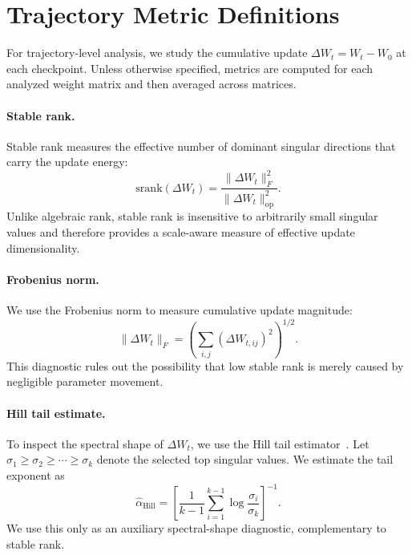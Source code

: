 \documentclass{llmxive}
\begin{document}
\section{Trajectory Metric Definitions}
\label{app:trajectory-metrics}

For trajectory-level analysis, we study the cumulative update
$\Delta W_t = W_t - W_0$ at each checkpoint. Unless otherwise specified,
metrics are computed for each analyzed weight matrix and then averaged
across matrices.

\paragraph{Stable rank.}
Stable rank measures the effective number of dominant singular directions
that carry the update energy:
\begin{equation}
    \mathrm{srank}(\Delta W_t)
    =
    \frac{\|\Delta W_t\|_F^2}
         {\|\Delta W_t\|_{\mathrm{op}}^2}.
\end{equation}
Unlike algebraic rank, stable rank is insensitive to arbitrarily small
singular values and therefore provides a scale-aware measure of effective
update dimensionality.

\paragraph{Frobenius norm.}
We use the Frobenius norm to measure cumulative update magnitude:
\begin{equation}
    \|\Delta W_t\|_F
    =
    \left(
    \sum_{i,j} (\Delta W_{t,ij})^2
    \right)^{1/2}.
\end{equation}
This diagnostic rules out the possibility that low stable rank is merely
caused by negligible parameter movement.

\paragraph{Hill tail estimate.}
To inspect the spectral shape of $\Delta W_t$, we use the Hill tail
estimator~\cite{8b55684a-14a0-31e4-b039-d044b4625cb8}. Let
$\sigma_1 \geq \sigma_2 \geq \cdots \geq \sigma_k$ denote the selected
top singular values. We estimate the tail exponent as
\begin{equation}
    \widehat{\alpha}_{\mathrm{Hill}}
    =
    \left[
    \frac{1}{k-1}
    \sum_{i=1}^{k-1}
    \log
    \frac{\sigma_i}{\sigma_k}
    \right]^{-1}.
\end{equation}
We use this only as an auxiliary spectral-shape diagnostic, complementary
to stable rank.
\end{document}
